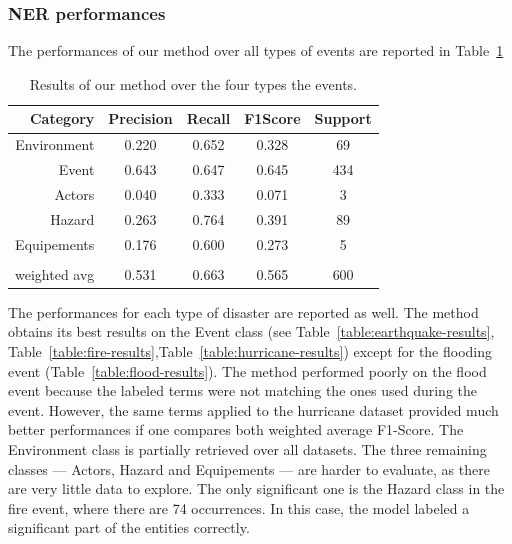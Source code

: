 \subsubsection{NER performances}

The performances of our method over all types of events are reported in Table~\ref{table:overall-results}

\begin{table}[bp]
    \centering
    \caption{Results of our method over the four types the events.}
    \begin{tabular}{rcccc}
        Category     & Precision & Recall & F1\-Score & Support \\
        \toprule
        Environment  & 0.220     & 0.652  & 0.328     & 69      \\
        Event        & 0.643     & 0.647  & 0.645     & 434     \\
        Actors       & 0.040     & 0.333  & 0.071     & 3       \\
        Hazard       & 0.263     & 0.764  & 0.391     & 89      \\
        Equipements  & 0.176     & 0.600  & 0.273     & 5       \\
                     &           &        &           &         \\
        weighted avg & 0.531     & 0.663  & 0.565     & 600     \\
        \bottomrule
    \end{tabular}
    \label{table:overall-results}
\end{table}

The performances for each type of disaster are reported as well.
The method obtains its best results on the Event class (see Table~\ref{table:earthquake-results}, Table~\ref{table:fire-results},Table~\ref{table:hurricane-results}) except for the flooding event (Table~\ref{table:flood-results}).
The method performed poorly on the flood event because the labeled terms were not matching the ones used during the event.
However, the same terms applied to the hurricane dataset provided much better performances if one compares both weighted average F1-Score.
The Environment class is partially retrieved over all datasets.
The three remaining classes — Actors, Hazard and Equipements — are harder to evaluate, as there are very little data to explore.
The only significant one is the Hazard class in the fire event, where there are 74 occurrences.
In this case, the model labeled a significant part of the entities correctly.

